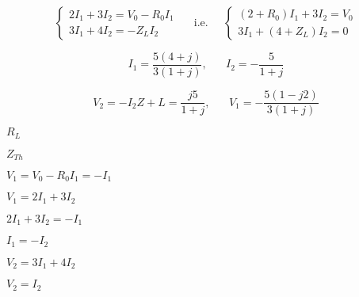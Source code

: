 {\newpage\clearpage
{}%
\begin{displaymath} \left\{ \begin{array}{l} 2I_1+3I_2=V_0-R_0I_1\\3I_1+4I_2=-Z_LI_2\end{array}\right. 
      \;\;\;\;\;\mbox{i.e.}\;\;\;\;\;
    \left\{ \begin{array}{l} (2+R_0)I_1+3I_2=V_0\\3I_1+(4+Z_L)I_2=0\end{array}\right. \end{displaymath}%
\lthtmldisplayZ
\lthtmlcheckvsize\clearpage}

{\newpage\clearpage
{}%
\begin{displaymath} I_1=\frac{5(4+j)}{3(1+j)},\;\;\;\;\;\;I_2=-\frac{5}{1+j}\end{displaymath}%
\lthtmldisplayZ
\lthtmlcheckvsize\clearpage}

{\newpage\clearpage
{}%
\begin{displaymath} V_2=-I_2Z+L=\frac{j5}{1+j},\;\;\;\;\;\; V_1=-\frac{5(1-j2)}{3(1+j)} \end{displaymath}%
\lthtmldisplayZ
\lthtmlcheckvsize\clearpage}

{\newpage\clearpage
{}%
$R_L$%
\lthtmlinlinemathZ
\lthtmlcheckvsize\clearpage}

{\newpage\clearpage
{}%
$Z_{Th}$%
\lthtmlinlinemathZ
\lthtmlcheckvsize\clearpage}

{\newpage\clearpage
{}%
$V_1=V_0-R_0I_1=-I_1$%
\lthtmlinlinemathZ
\lthtmlcheckvsize\clearpage}

{\newpage\clearpage
{}%
$V_1=2I_1+3I_2$%
\lthtmlinlinemathZ
\lthtmlcheckvsize\clearpage}

{\newpage\clearpage
{}%
$ 2I_1+3I_2=-I_1$%
\lthtmlinlinemathZ
\lthtmlcheckvsize\clearpage}

{\newpage\clearpage
{}%
$I_1=-I_2$%
\lthtmlinlinemathZ
\lthtmlcheckvsize\clearpage}

{\newpage\clearpage
{}%
$V_2=3I_1+4I_2$%
\lthtmlinlinemathZ
\lthtmlcheckvsize\clearpage}

{\newpage\clearpage
{}%
$ V_2=I_2$%
\lthtmlinlinemathZ
\lthtmlcheckvsize\clearpage}

